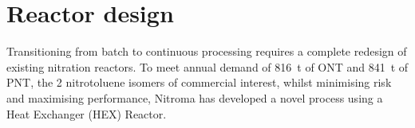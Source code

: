 \section*{Reactor design}
Transitioning from batch to continuous processing requires a complete redesign of existing nitration reactors. To meet annual demand of \SI{816}{\tonne} of ONT and \SI{841}{\tonne} of PNT, the 2 nitrotoluene isomers of commercial interest, whilst minimising risk and maximising performance, Nitroma has developed a novel process using a Heat Exchanger (HEX) Reactor.


